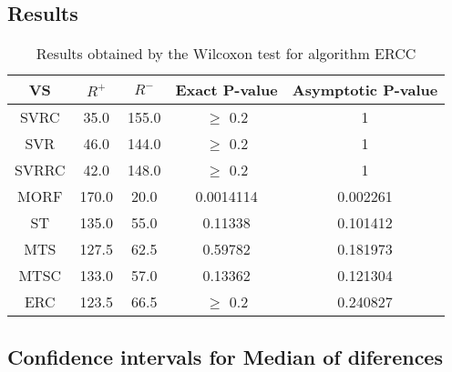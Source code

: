 \documentclass[a4paper,10pt]{article}
\begin{document}
\subsection{Results}

\begin{table}[!htp]
\centering\small
\begin{tabular}{
|c|c|c|c|c|}
\hline
 VS & $R^{+}$ & $R^{-}$ & Exact P-value & Asymptotic P-value \\ \hline 
SVRC & 35.0 & 155.0 & $\geq$ 0.2 & 1\\ \hline 
SVR & 46.0 & 144.0 & $\geq$ 0.2 & 1\\ \hline 
SVRRC & 42.0 & 148.0 & $\geq$ 0.2 & 1\\ \hline 
MORF & 170.0 & 20.0 & 0.0014114 & 0.002261\\ \hline 
ST & 135.0 & 55.0 & 0.11338 & 0.101412\\ \hline 
MTS & 127.5 & 62.5 & 0.59782 & 0.181973\\ \hline 
MTSC & 133.0 & 57.0 & 0.13362 & 0.121304\\ \hline 
ERC & 123.5 & 66.5 & $\geq$ 0.2 & 0.240827\\ \hline 

\end{tabular}
\caption{Results obtained by the Wilcoxon test for algorithm ERCC}
\end{table}

\subsection{Confidence intervals for Median of diferences}
\end{document}
